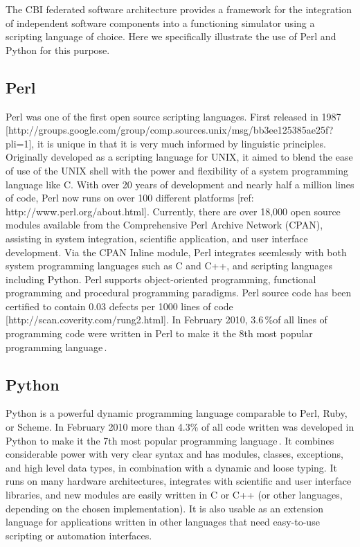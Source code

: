\documentclass[12pt]{article}
\begin{document}
The CBI federated software architecture provides a framework for the
integration of independent software components into a functioning
simulator using a scripting language of choice.
Here we specifically illustrate the use of Perl and Python for this
purpose.

\subsection{Perl}

Perl was one of the first open source scripting languages. First
released in 1987
[http://groups.google.com/group/comp.sources.unix/msg/bb3ee125385ae25f?pli=1],
it is unique in that it is very much informed by linguistic
principles.  Originally developed as a scripting language for UNIX, it
aimed to blend the ease of use of the UNIX shell with the power and
flexibility of a system programming language like C.  With over 20
years of development and nearly half a million lines of code, Perl now
runs on over 100 different platforms [ref:
http://www.perl.org/about.html].  Currently, there are over 18,000
open source modules available from the Comprehensive Perl Archive
Network (CPAN), assisting in system integration, scientific
application, and user interface development.  Via the CPAN Inline
module, Perl integrates seemlessly with both system programming
languages such as C and C++, and scripting languages including Python.
Perl supports object-oriented programming, functional programming and
procedural programming paradigms.  Perl source code has been certified
to contain 0.03 defects per 1000 lines of code
[http://scan.coverity.com/rung2.html].  In February 2010,
3.6\,\%of all lines of programming code were written in Perl to make
it the 8th most popular programming
language\,\cite{software09:_tiobe_progr_commun_index}.

\subsection{Python}

Python is a powerful dynamic programming language comparable to Perl,
Ruby, or Scheme.  In February 2010 more than 4.3\% of all code written was
developed in Python to make it the 7th most popular programming
language\,\cite{software09:_tiobe_progr_commun_index}. It combines
considerable power with very clear syntax and has modules, classes,
exceptions, and high level data types, in combination with a dynamic
and loose typing. It runs on many hardware architectures, integrates
with scientific and user interface libraries, and new modules are
easily written in C or C++ (or other languages, depending on the
chosen implementation). It is also usable as an extension language for
applications written in other languages that need easy-to-use
scripting or automation interfaces.
\end{document}
